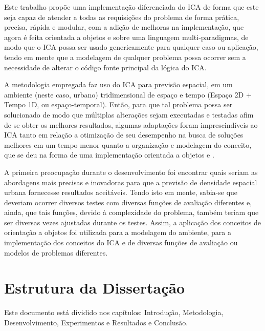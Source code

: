 Este trabalho propõe uma implementação diferenciada do ICA de forma que este seja capaz de atender a todas as requisições do problema de forma prática, precisa, rápida e modular, com a adição de melhoras na implementação, que agora é feita orientada a objetos e sobre uma linguagem multi-paradigmas, de modo que o ICA possa ser usado genericamente para qualquer caso ou aplicação, tendo em mente que a modelagem de qualquer problema possa ocorrer sem a necessidade de alterar o código fonte principal da lógica do ICA. 

A metodologia empregada faz uso do ICA para previsão espacial, em um ambiente (neste caso, urbano) tridimensional de espaço e tempo (Espaço 2D + Tempo 1D, ou espaço-temporal). Então, para que tal problema possa ser solucionado de modo que múltiplas alterações sejam executadas e testadas afim de se obter os melhores resultados, algumas adaptações foram imprescindíveis ao ICA tanto em relação a otimização de seu desempenho na busca de soluções melhores em um tempo menor  quanto a organização e modelagem do conceito, que se deu na forma de uma implementação orientada a objetos \cite{booch1982object} e \cite{coad1991object}. 

A primeira preocupação durante o desenvolvimento foi encontrar quais seriam as abordagens mais precisas e inovadoras para que a previsão de densidade espacial urbana fornecesse resultados aceitáveis. Tendo isto em mente, sabia-se que deveriam ocorrer diversos testes com diversas funções de avaliação diferentes e, ainda, que tais funções, devido à complexidade do problema, também teriam que ser diversas vezes ajustadas durante os testes. Assim, a aplicação dos conceitos de orientação a objetos foi utilizada para a modelagem do ambiente, para a implementação dos conceitos do ICA e de diversas funções de avaliação ou modelos de problemas diferentes.





\section{Estrutura da Dissertação}


Este documento está dividido nos capítulos: Introdução, Metodologia, Desenvolvimento, Experimentos e Resultados e Conclusão.


